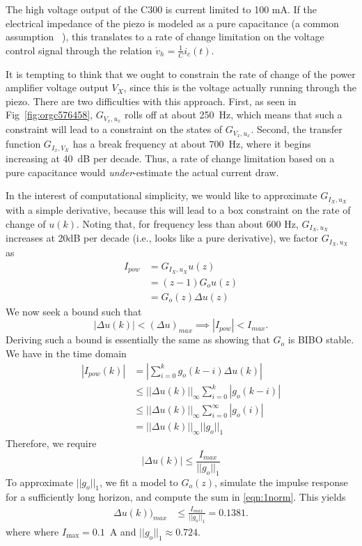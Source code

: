 \documentclass[journal,twocolumn,twoside]{IEEEtran}
\begin{document}
The high voltage output of the C300 is current limited to 100 mA. If the electrical impedance of the piezo is modeled as a pure capacitance (a common assumption  ~\cite{fleming_megahertz_2009, Bazghaleh_digital_2013}), this translates to a rate of change limitation on the voltage control signal through the relation $\dot v_{h} = \frac{1}{C} i_c(t)$. 

It is tempting to think that we ought to constrain the rate of change of the power amplifier voltage output $V_X$, since this is the voltage actually running through the piezo. There are two difficulties with this approach. First, as seen in Fig~\ref{fig:orgc576458}, \(G_{V_{x},u_{x}}\) rolls off at about 250~Hz, which means that such a constraint will lead to a constraint on the states of \(G_{V_{x},u_{x}}\). Second, the transfer function \(G_{I_{x}, V_{X}}\) has a break frequency at about 700~Hz, where it begins increasing at 40~dB per decade. Thus, a rate of change limitation based on a pure capacitance would \emph{under}-estimate the actual current draw.


In the interest of computational simplicity, we would like to approximate $G_{I_X,u_X}$ with a simple derivative, because this will lead to a box constraint on the rate of change of $u(k)$. Noting that, for frequency less than about 600 Hz, $G_{I_X,u_X}$ increases at 20dB per decade (i.e., looks like a pure derivative), we factor $G_{I_X,u_X}$ as
\begin{align}
  I_{pow} &= G_{I_X,u_X} u(z)\\
          & = (z-1) G_o u(z)\\
          & = G_o(z) \Delta u(z)
\end{align}
We now seek a bound such that
\begin{equation}
  |\Delta u(k)| < (\Delta u)_{max} \implies |I_{pow}| < I_{max}.
\end{equation}
Deriving such a bound is essentially the same as showing that $G_o$ is BIBO stable. We have in the time domain
\begin{align}
  |I_{pow}(k)| &= |\sum_{i=0}^{k} g_o(k-i)\Delta u(k)|\\
               &\leq ||\Delta u(k)||_{\infty} \sum_{i=0}^{k} |g_o(k-i)|  \\
               & \leq ||\Delta u(k)||_{\infty} \sum_{i=0}^{\infty} |g_o(i)|  \label{eqn:1norm}\\
               & = ||\Delta u(k)||_{\infty} ||g_o||_1  
\end{align}
Therefore, we require
\begin{equation}
|\Delta u(k)| \leq \frac{I_{max}}{||g_o||_1}
\end{equation}
To approximate $||g_o||_1$, we fit a model to $G_o(z)$, simulate the impulse response for a sufficiently long horizon, and compute the sum in \eqref{eqn:1norm}. This yields
\begin{align}
\Delta u(k))_{max} & \leq \frac{I_{max}}{||g_o||_1} = 0.1381. \label{eqn:du_limit}
\end{align}
where where $I_{\text{max}} = 0.1$~A and $||g_o||_1 \approx 0.724$.
\end{document}
